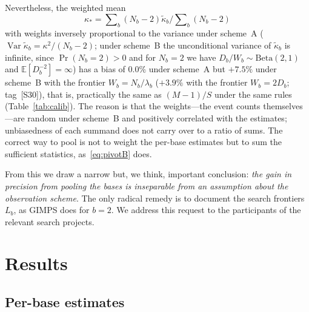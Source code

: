 \documentclass[11pt,a4paper]{article}
\theoremstyle{plain}
\theoremstyle{remark}
\begin{document}
Nevertheless, the weighted mean
$$\kappa_\ast=\sum\nolimits_b(N_b-2)\tilde\kappa_b\Big/\sum\nolimits_b(N_b-2)$$
with weights inversely proportional to the variance under scheme~A
($\operatorname{Var}\tilde\kappa_b=\kappa^2/(N_b-2)$; under scheme~B the
unconditional variance of $\tilde\kappa_b$ is infinite, since $\Pr(N_b=2)>0$ and
for $N_b=2$ we have $D_b/W_b\sim\mathrm{Beta}(2,1)$ and
$\mathbb E[D_b^{-2}]=\infty$) has a bias of $0.0\%$ under scheme~A but $+7.5\%$
under scheme~B with the frontier $W_b=N_b/\lambda_b$ ($+3.9\%$ with the frontier
$W_b=2D_b$; tag~[S30]), that is, practically the same as $(M-1)/S$ under the same
rules (Table~\ref{tab:calib}). The reason
is that the weights---the event counts themselves---are random under scheme~B
and positively correlated with the estimates; unbiasedness of each summand does
not carry over to a ratio of sums. The correct way to pool is not to weight the
per-base estimates but to sum the sufficient statistics, as~\eqref{eq:pivotB}
does.

From this we draw a narrow but, we think, important conclusion: \emph{the gain
in precision from pooling the bases is inseparable from an assumption about the
observation scheme}. The only radical remedy is to document the search frontiers
$L_b$, as GIMPS does for $b=2$. We address this request to the participants of
the relevant search projects.

\section{Results}\label{sec:results}

\subsection{Per-base estimates}
\end{document}
